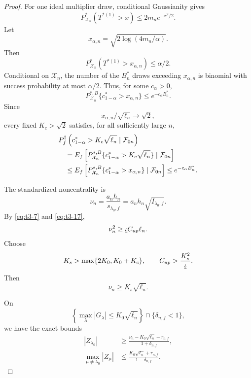 \documentclass[10pt,a4paper]{amsart}
\begin{document}
\begin{proof}
For one ideal multiplier draw, conditional Gaussianity gives
\[
P_{\mathcal X_n}^*(T^{*(1)}>x)
\le
2m_ne^{-x^2/2}.
\]
Let
\[
x_{\alpha,n}
=
\sqrt{2\log(4m_n/\alpha)}.
\]
Then
\[
P_{\mathcal X_n}^*
(T^{*(1)}>x_{\alpha,n})
\le\alpha/2.
\]
Conditional on \(\mathcal X_n\), the number of the \(B_n^*\) draws
exceeding \(x_{\alpha,n}\) is binomial with success probability at
most \(\alpha/2\).  Thus, for some \(c_\alpha>0\),
\begin{equation}
P_{\mathcal X_n}^{*,B}
\{c_{1-\alpha}^*>x_{\alpha,n}\}
\le
e^{-c_\alpha B_n^*}.
\label{eq:t3-32}
\end{equation}
Since
\[
x_{\alpha,n}/\sqrt{\ell_n}\longrightarrow\sqrt2,
\]
every fixed \(K_c>\sqrt2\) satisfies, for all sufficiently large \(n\),
\begin{align}
&P_f^\dagger\left(
c_{1-\alpha}^*>K_c\sqrt{\ell_n}
\mid\mathcal F_{0n}
\right)
\notag\\
&\quad=
E_f\left[
P_{\mathcal X_n}^{*,B}
\{c_{1-\alpha}^*>K_c\sqrt{\ell_n}\}
\mid\mathcal F_{0n}
\right]
\notag\\
&\quad\le
E_f\left[
P_{\mathcal X_n}^{*,B}
\{c_{1-\alpha}^*>x_{\alpha,n}\}
\mid\mathcal F_{0n}
\right]
\le
e^{-c_\alpha B_n^*}.
\label{eq:t3-33}
\end{align}

The standardized noncentrality is
\[
\nu_n
=
\frac{a_n h_n}{s_{\lambda_0,f}}
=
a_n h_n\sqrt{I_{\lambda_0,f}}.
\]
By \eqref{eq:t3-7} and \eqref{eq:t3-17},
\[
\nu_n^2
\ge
\underline\iota C_{\rm up}\ell_n.
\]
Choose
\[
K_s>\max\{2K_0,K_0+K_c\},
\qquad
C_{\rm up}>
\frac{K_s^2}{\underline\iota}.
\]
Then
\begin{equation}
\nu_n
\ge
K_s\sqrt{\ell_n}.
\label{eq:t3-34}
\end{equation}

On
\[
\left\{
\max_\lambda|G_\lambda|
\le K_0\sqrt{\ell_n}
\right\}
\cap
\{\delta_{n,f}<1\},
\]
we have the exact bounds
\begin{align}
|Z_{\lambda_0}|
&\ge
\frac{
\nu_n-K_0\sqrt{\ell_n}-r_{n,f}
}{
1+\delta_{n,f}
},
\label{eq:t3-35}\\
\max_{\mu\ne\lambda_0}|Z_\mu|
&\le
\frac{
K_0\sqrt{\ell_n}+r_{n,f}
}{
1-\delta_{n,f}
}.
\label{eq:t3-36}
\end{align}


\end{proof}
\end{document}

